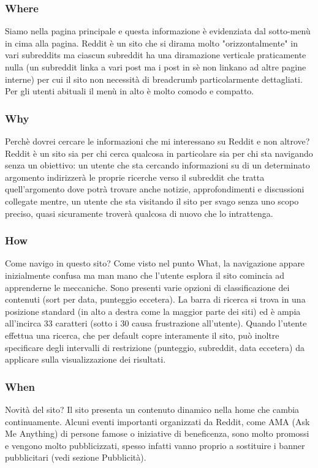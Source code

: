 \documentclass[12pt]{article}
\begin{document}
\subsubsection{Where} Siamo nella pagina principale e questa informazione \`e evidenziata dal sotto-men\`u in cima alla pagina. Reddit \`e un sito che si dirama molto "orizzontalmente" in vari subreddits ma ciascun subreddit ha una diramazione verticale praticamente nulla (un subreddit linka a vari post ma i post in s\`e non linkano ad altre pagine interne) per cui il sito non necessit\`a di breadcrumb particolarmente dettagliati. \\Per gli utenti abituali il men\`u in alto \`e molto comodo e compatto.
\\

\subsubsection{Why} Perch\`e dovrei cercare le informazioni che mi interessano su Reddit e non altrove? Reddit \`e un sito sia per chi cerca qualcosa in particolare sia per chi sta navigando senza un obiettivo: un utente che sta cercando informazioni su di un determinato argomento indirizzer\`a le proprie ricerche verso il subreddit che tratta quell'argomento dove potr\`a trovare anche notizie, approfondimenti e discussioni collegate mentre, un utente che sta visitando il sito per svago senza uno scopo preciso, quasi sicuramente trover\`a qualcosa di nuovo che lo intrattenga.
\\
\subsubsection{How} Come navigo in questo sito? Come visto nel punto What, la navigazione appare inizialmente confusa ma man mano che l'utente esplora il sito comincia ad apprenderne le meccaniche. Sono presenti varie opzioni di classificazione dei contenuti (sort per data, punteggio eccetera). La barra di ricerca si trova in una posizione standard (in alto a destra come la maggior parte dei siti) ed \`e ampia all'incirca 33 caratteri (sotto i 30 causa frustrazione all'utente). Quando l'utente effettua una ricerca, che per default copre interamente il sito, pu\`o inoltre specificare degli intervalli di restrizione (punteggio, subreddit, data eccetera) da applicare sulla visualizzazione dei risultati.
\\
\subsubsection{When} Novit\`a del sito? Il sito presenta un contenuto dinamico nella home che cambia continuamente. Alcuni eventi importanti organizzati da Reddit, come AMA (Ask Me Anything) di persone famose o iniziative di beneficenza, sono molto promossi e vengono molto pubblicizzati, spesso infatti
 vanno proprio a sostituire i banner pubblicitari (vedi sezione Pubblicit\`a).
\\
\end{document}
